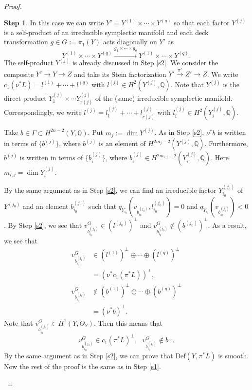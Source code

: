 \documentclass[12pt,a4paper]{amsart}
\theoremstyle{remark}
\theoremstyle{definition}
\newtheorem{Step}{Step}
\def\dim{\operatorname{dim}}
\begin{document}
\begin{proof}
\begin{Step}
In this case we can write $Y' = Y^{(1)} \times \cdots  \times Y^{(q)}$ so that each factor $Y^{(j)}$ is a self-product of an  irreducible 
symplectic manifold and each deck transformation 
$g \in G := \pi_1(Y)$ acts diagonally on $Y'$ as 
$$Y^{(1)} \times \cdots  \times Y^{(q)} \stackrel{g_1 \times \cdots  \times g_q}\longrightarrow Y^{(1)} \times \cdots  \times Y^{(q)}.$$
The self-product $Y^{(j)}$ is already discussed in Step \ref{s2}. 
We consider the composite $Y' \to Y \to Z$ and take its Stein factorization $Y' \stackrel{\pi'}\to Z' \to Z$. 
We write $c_1(\nu^*L) = l^{(1)} + \cdots  + l^{(q)}$ with $l^{(j)} \in H^2(Y^{(j)}, \mathbb{Q})$. Note that $Y^{(j)}$ is the direct product 
$Y_1^{(j)} \times \cdots  Y_{r(j)}^{(j)}$ of the (same) irreducible symplectic manifold. Correspondingly,  
we write $l^{(j)} = l_1^{(j)} + \cdots  + l_{r(j)}^{(j)}$ with $l_i^{(j)} \in H^2(Y_i^{(j)}, \mathbb{Q})$. 
 
Take $b \in \Gamma \subset H^{2n-2}(Y, \mathbb{Q})$. Put $m_j := \dim Y^{(j)}$. As in 
Step \ref{s2}, 
$\nu^*b$ is written in terms of $\{b^{(j)}\}$, where $b^{(j)}$ is an element of $H^{2m_j -2}(Y^{(j)}, \mathbb{Q})$. Furthermore, $b^{(j)}$ is written in terms of $\{b_i^{(j)} \}$, where 
$b_i^{(j)} \in H^{2m_{i,j} -2}(Y_i^{(j)}, \mathbb{Q})$. Here $m_{i,j} = \dim Y_i^{(j)}$.   

By the same argument as in Step  \ref{s2}, 
we can find an irreducible factor 
$Y_{i_0}^{(j_0)}$ of $Y^{(j_0)}$ and an element $b_{i_0}^{(j_0)}$ such that $q_{Y_{i_0}}(v_{b_{i_0}^{(j_0)}}, l_{i_0}^{(j_0)}) = 0$ and 
$q_{Y_{i_0}}(v_{b_{i_0}^{(j_0)}}) < 0$. By Step \ref{s2}, 
we see that $v^G_{b_{i_0}^{(j_0)}} \in (l^{(j_0)})^{\perp}$ and 
$v^G_{b_{i_0}^{(j_0)}} \notin (b^{(j_0)})^{\perp}$.
As a result, we see that 
\begin{align*}
v^G_{{b_{i_0}^{(j_0)}}} 
&\in (l^{(1)})^{\perp} \oplus \cdots \oplus (l^{(q)})^{\perp} \\ 
&= (\nu^*c_1(\pi^*L))^{\perp}, \:\:\:\:  \\
v^G_{{b_{i_0}^{(j_0)}}} &\notin (b^{(1)})^{\perp} \oplus \cdots  \oplus (b^{(q)})^{\perp}\\ 
&= (\nu^*b)^{\perp}. 
\end{align*}
Note that $v^G_{{b_{i_0}^{(j_0)}}} \in H^1(Y, \Theta_Y)$. Then this means that 
$$v^G_{{b_{i_0}^{(j_0)}}} \in c_1(\pi^*L)^{\perp}, \:\:\: 
v^G_{{b_{i_0}^{(j_0)}}} \notin b^{\perp}.$$
By the same argument as in 
Step \ref{s2}, 
we can prove that $\mathrm{Def}(Y, \pi^*L)$ is smooth. Now the rest of the proof is the same as in 
Step \ref{s1}. 
\vspace{0.2cm}


\end{Step}
\end{proof}
\end{document}
